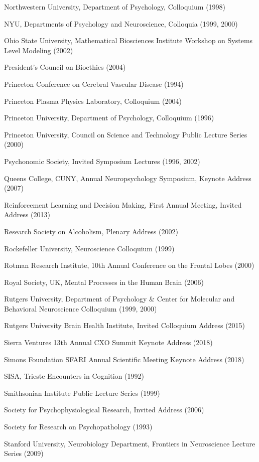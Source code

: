 \documentclass[10 pt]{article}
\begin{document}
Northwestern University, Department of Psychology, Colloquium (1998)

NYU, Departments of Psychology and Neuroscience, Colloquia (1999, 2000)

Ohio State University, Mathematical Biosciences Institute Workshop on Systems Level Modeling (2002)

President’s Council on Bioethics (2004)

Princeton Conference on Cerebral Vascular Disease (1994)

Princeton Plasma Physics Laboratory, Colloquium (2004)

Princeton University, Department of Psychology, Colloquium (1996)

Princeton University, Council on Science and Technology Public Lecture Series (2000)

Psychonomic Society, Invited Symposium Lectures (1996, 2002)

Queens College, CUNY, Annual Neuropsychology Symposium, Keynote Address (2007)

Reinforcement Learning and Decision Making, First Annual Meeting, Invited Address (2013)

Research Society on Alcoholism, Plenary Address (2002)

Rockefeller University, Neuroscience Colloquium (1999)

Rotman Research Institute, 10th Annual Conference on the Frontal Lobes (2000)

Royal Society, UK, Mental Processes in the Human Brain (2006)

Rutgers University, Department of Psychology \& Center for Molecular and Behavioral Neuroscience Colloquium (1999, 2000)

Rutgers University Brain Health Institute, Invited Colloquium Address (2015)

Sierra Ventures 13th Annual CXO Summit Keynote Address (2018)

Simons Foundation SFARI Annual Scientific Meeting Keynote Address (2018)

SISA, Trieste Encounters in Cognition (1992)

Smithsonian Institute Public Lecture Series (1999)

Society for Psychophysiological Research, Invited Address (2006)

Society for Research on Psychopathology (1993)

Stanford University, Neurobiology Department, Frontiers in Neuroscience Lecture Series (2009)
\end{document}
